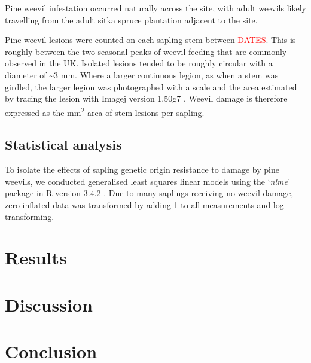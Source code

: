 \documentclass[a4paper, 11pt]{article}
\newcommand{\todo}[1]{\textcolor{red}{#1}}   %
\begin{document}
Pine weevil infestation occurred naturally across the site, with adult weevils likely travelling from the adult sitka spruce plantation adjacent to the site. 

Pine weevil lesions were counted on each sapling stem between \todo{DATES}. This is roughly between the two seasonal peaks of weevil feeding that are commonly observed in the UK. Isolated lesions tended to be roughly circular with a diameter of \textasciitilde{}3 mm. Where a larger continuous legion, as when a stem was girdled, the larger legion was photographed with a scale and the area estimated by tracing the lesion with Imagej version 1.50g7 \citep{Schneider2012}. Weevil damage is therefore expressed as the mm\textsuperscript{2} area of stem lesions per sapling. 

\subsection*{Statistical analysis}

To isolate the effects of sapling genetic origin resistance to damage by pine weevils, we conducted generalised least squares linear models using the `\textit{nlme}' package \citep{Pinheiro2018} in R version 3.4.2 \citep{RCoreTeam2017}. Due to many saplings receiving no weevil damage, zero-inflated data was transformed by adding 1 to all measurements and log transforming.


\section*{Results}

\section*{Discussion}

\section*{Conclusion}


\end{document}
